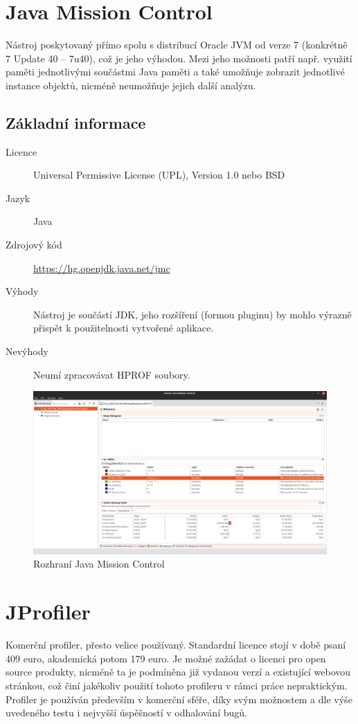 \section{Java Mission Control}
Nástroj poskytovaný přímo spolu s distribucí Oracle JVM od verze 7 (konkrétně 7 Update 40 – 7u40), což je jeho výhodou. Mezi jeho možnosti patří např. využití paměti jednotlivými součástmi Java paměti a také umožňuje zobrazit jednotlivé instance objektů, nicméně neumožňuje jejich další analýzu.

\subsection{Základní informace}

\begin{description}
    \item[Licence] Universal Permissive License (UPL), Version 1.0 nebo BSD
    \item[Jazyk] Java
    \item[Zdrojový kód] \url{https://hg.openjdk.java.net/jmc} 
    \item[Výhody] Nástroj je součástí JDK, jeho rozšíření (formou pluginu) by mohlo výrazně přispět k použitelnosti vytvořené aplikace.
    \item[Nevýhody] Neumí zpracovávat HPROF soubory.
\end{description}

\begin{figure}[ht!]
	\centering
	\includegraphics[scale=0.3]{obrazky/jmc.png}
	\caption{Rozhraní Java Mission Control}
	\label{obr-jmc}
\end{figure}

\section{JProfiler}
Komerční profiler, přesto velice používaný. Standardní licence stojí v době psaní 409 euro, akademická potom 179 euro. Je možné zažádat o licenci pro open source produkty, nicméně ta je podmíněna již vydanou verzí a existující webovou stránkou, což činí jakékoliv použití tohoto profileru v rámci práce nepraktickým. Profiler je používán především v komerční sféře, díky svým možnostem a dle výše uvedeného testu i nejvyšší úspěšností v odhalování bugů.

